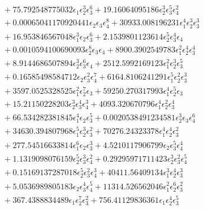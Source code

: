 \documentclass[10pt]{article}
\begin{document}
\begin{align*}
&{}  + 75.792548775032 \epsilon_{1} \epsilon_{2}^{3} \epsilon_{3}^{6} + 19.16064095186 \epsilon_{2}^{3} \epsilon_{3}^{5} \epsilon_{4}^{2} \\
&{}  + 0.00065041170920441 \epsilon_{2} \epsilon_{3} \epsilon_{4}^{8} + 30933.008196231 \epsilon_{1}^{4} \epsilon_{2}^{3} \epsilon_{3}^{3} \\
&{}  + 16.953846567048 \epsilon_{1}^{3} \epsilon_{2} \epsilon_{3}^{6} + 2.1539801123614 \epsilon_{2}^{5} \epsilon_{3}^{4} \epsilon_{4} \\
&{}  + 0.0010594100690093 \epsilon_{2}^{8} \epsilon_{3} \epsilon_{4} + 8900.3902549783 \epsilon_{1}^{2} \epsilon_{2}^{4} \epsilon_{3}^{4} \\
&{}  + 8.9144686507894 \epsilon_{2}^{3} \epsilon_{3}^{6} \epsilon_{4} + 2512.5992169123 \epsilon_{1}^{2} \epsilon_{2}^{3} \epsilon_{3}^{5} \\
&{}  + 0.16585498584712 \epsilon_{2} \epsilon_{3}^{2} \epsilon_{4}^{7} + 6164.8106241291 \epsilon_{1}^{5} \epsilon_{2}^{2} \epsilon_{3}^{3} \\
&{}  + 3597.0525328525 \epsilon_{1}^{2} \epsilon_{2}^{7} \epsilon_{3} + 59250.270317993 \epsilon_{1}^{4} \epsilon_{2}^{5} \epsilon_{3} \\
&{}  + 15.21150228203 \epsilon_{2}^{3} \epsilon_{3}^{4} \epsilon_{4}^{3} + 4093.320670796 \epsilon_{1}^{4} \epsilon_{2}^{2} \epsilon_{3}^{4} \\
&{}  + 66.534282381845 \epsilon_{1}^{4} \epsilon_{2} \epsilon_{3}^{5} + 0.0020538491234581 \epsilon_{2}^{3} \epsilon_{3} \epsilon_{4}^{6} \\
&{}  + 34630.394807968 \epsilon_{1}^{5} \epsilon_{2}^{3} \epsilon_{3}^{2} + 70276.24323378 \epsilon_{1}^{4} \epsilon_{2}^{4} \epsilon_{3}^{2} \\
&{}  + 277.54516633814 \epsilon_{1}^{6} \epsilon_{2} \epsilon_{3}^{3} + 4.5210117906799 \epsilon_{2} \epsilon_{3}^{5} \epsilon_{4}^{4} \\
&{}  + 1.1319098076159 \epsilon_{2}^{5} \epsilon_{3}^{3} \epsilon_{4}^{2} + 0.29295971711423 \epsilon_{2}^{3} \epsilon_{3}^{2} \epsilon_{4}^{5} \\
&{}  + 0.15169137287018 \epsilon_{2}^{5} \epsilon_{3}^{2} \epsilon_{4}^{3} + 40411.56409134 \epsilon_{1}^{3} \epsilon_{2}^{4} \epsilon_{3}^{3} \\
&{}  + 5.0536989805183 \epsilon_{2} \epsilon_{3}^{4} \epsilon_{4}^{5} + 11314.526562046 \epsilon_{1}^{2} \epsilon_{2}^{6} \epsilon_{3}^{2} \\
&{}  + 367.4388834489 \epsilon_{1} \epsilon_{2}^{7} \epsilon_{3}^{2} + 756.41129836361 \epsilon_{1} \epsilon_{2}^{4} \epsilon_{3}^{5} \\

\end{align*}
\end{document}
